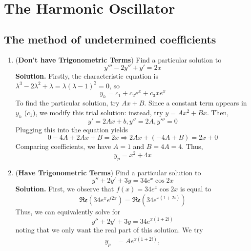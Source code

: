 \documentclass{article}
\begin{document}
\section{The Harmonic Oscillator}
\subsection{The method of undetermined coefficients}
\begin{enumerate}
    \item (\textbf{Don't have Trigonometric Terms}) Find a particular solution to
    \begin{equation}
        y'''-2y''+y'=2x
    \end{equation}
    \textbf{Solution.} Firstly, the characteristic equation is $\lambda^3-2\lambda^2+\lambda=\lambda(\lambda-1)^2=0$, so
    \begin{equation*}
        y_h=c_1+c_2e^x+c_3xe^x
    \end{equation*}
    To find the particular solution, try $Ax+B$. Since a constant term appears in $y_h$ ($c_1$), we modify this trial solution: instead, try $y=Ax^2+Bx$. Then,
    \begin{equation*}
        y'=2Ax+b,y''=2A,y'''=0
    \end{equation*}
    Plugging this into the equation yields
    \begin{equation*}
        0-4A+2Ax+B=2x\Rightarrow 2Ax+(-4A+B)=2x+0
    \end{equation*}
    Comparing coefficients, we have $A=1$ and $B=4A=4$. Thus,
    \begin{equation*}
        y_p=x^2+4x
    \end{equation*}
    \item (\textbf{Have Trigonometric Terms}) Find a particular solution to
    \begin{equation}
        y''+2y'+3y=34e^x\cos 2x
    \end{equation}
    \textbf{Solution.} First, we observe that $f(x)=34e^x\cos 2x$ is equal to
    \begin{equation*}
        \mathfrak{Re}(34e^xe^{i2x})=\mathfrak{Re}(34e^{x(1+2i)})
    \end{equation*}
    Thus, we can equivalently solve for
    \begin{equation*}
        y''+2y'+3y=34e^{x(1+2i)}
    \end{equation*}
    noting that we only want the real part of this solution. We try
    \begin{align*}
        y_p&=Ae^{x(1+2i)}, \\

\end{align*}
\end{enumerate}
\end{document}
